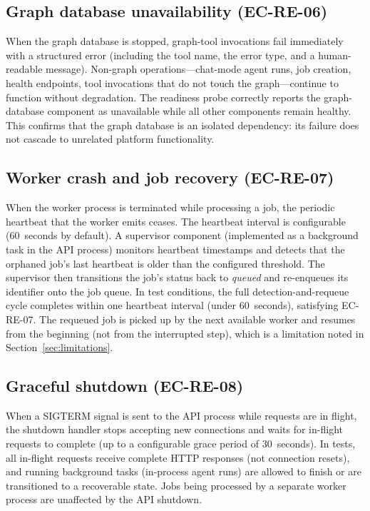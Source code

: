 \documentclass[a4paper,noexaminfo]{sapthesis}
\begin{document}
\subsection{Graph database unavailability (EC-RE-06)}

When the graph database is stopped, graph-tool invocations fail
immediately with a structured error (including the tool name, the error
type, and a human-readable message).  Non-graph operations---chat-mode
agent runs, job creation, health endpoints, tool invocations that do not
touch the graph---continue to function without degradation.  The
readiness probe correctly reports the graph-database component as
unavailable while all other components remain healthy.  This confirms
that the graph database is an isolated dependency: its failure does not
cascade to unrelated platform functionality.

\subsection{Worker crash and job recovery (EC-RE-07)}

When the worker process is terminated while processing a job, the
periodic heartbeat that the worker emits ceases.  The heartbeat interval
is configurable (60~seconds by default).  A supervisor component
(implemented as a background task in the API process) monitors heartbeat
timestamps and detects that the orphaned job's last heartbeat is older
than the configured threshold.  The supervisor then transitions the
job's status back to \emph{queued} and re-enqueues its identifier onto
the job queue.  In test conditions, the full detection-and-requeue
cycle completes within one heartbeat interval (under 60~seconds),
satisfying EC-RE-07.  The requeued job is picked up by the next
available worker and resumes from the beginning (not from the
interrupted step), which is a limitation noted in
Section~\ref{sec:limitations}.

\subsection{Graceful shutdown (EC-RE-08)}

When a SIGTERM signal is sent to the API process while requests are in
flight, the shutdown handler stops accepting new connections and waits
for in-flight requests to complete (up to a configurable grace period of
30~seconds).  In tests, all in-flight requests receive complete HTTP
responses (not connection resets), and running background tasks
(in-process agent runs) are allowed to finish or are transitioned to a
recoverable state.  Jobs being processed by a separate worker process
are unaffected by the API shutdown.
\end{document}
